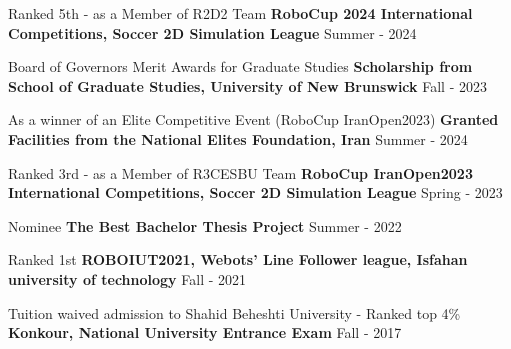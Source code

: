 \begin{cventries}
    
    \cventry
    {Ranked 5th - as a Member of R2D2 Team}
    {\textbf {RoboCup 2024 International Competitions, Soccer 2D Simulation League}}
    {}
    {Summer - 2024}
    {}
    
    
    \cventry
    {Board of Governors Merit Awards for Graduate Studies}
    {\textbf {Scholarship from School of Graduate Studies, University of New Brunswick}}
    {}
    {Fall - 2023}
    {}

    \cventry
    {As a winner of an Elite Competitive Event (RoboCup IranOpen2023)}
    {\textbf {Granted Facilities from the National Elites Foundation, Iran}}
    {}
    {Summer - 2024}
    {}


    \cventry
    {Ranked 3rd - as a Member of R3CESBU Team}
    {\textbf {RoboCup IranOpen2023 International Competitions, Soccer 2D Simulation League}}
    {}
    {Spring - 2023}
    {}

    
    \cventry
    {Nominee}
    {\textbf {The Best Bachelor Thesis Project}}
    {}
    {Summer - 2022}
    {}

    
    \cventry
    {Ranked 1st}
    {\textbf {ROBOIUT2021, Webots’ Line Follower league, Isfahan university of technology}}
    {}
    {Fall - 2021}
    {}




    \cventry
    {Tuition waived admission to Shahid Beheshti University - Ranked top 4\%}
    {\textbf {Konkour, National University Entrance Exam}}
    {}
    {Fall - 2017}
    {}
\end{cventries}